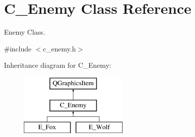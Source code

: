 \hypertarget{class_c___enemy}{}\section{C\+\_\+\+Enemy Class Reference}
\label{class_c___enemy}


Enemy Class.  




{\ttfamily \#include $<$c\+\_\+enemy.\+h$>$}

Inheritance diagram for C\+\_\+\+Enemy\+:\begin{figure}[H]
\begin{center}
\leavevmode
\includegraphics[height=3.000000cm]{class_c___enemy}
\end{center}
\end{figure}
